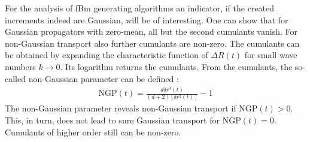 \documentclass[
  a4paper,BCOR10mm,oneside,
  headsepline,footsepline,%
  fleqn,openbib
]{scrbook}
\begin{document}

For the analysis of fBm generating algorithms an indicator, if the created increments indeed are Gaussian, will be of interesting. One can show that for Gaussian propagators with zero-mean, all but the second cumulants vanish. For non-Gaussian transport also further cumulants are non-zero. The cumulants can be obtained by expanding the characteristic function of $\Delta R(t)$ for small wave numbers $k \rightarrow 0$. Its logarithm returns the cumulants. From the cumulants, the so-called non-Gaussian parameter can be defined \cite{Hofling2013}:
\begin{align}
 \mathrm{NGP}(t)=\frac{d \delta r^{4}(t)}{(d+2) [\delta r^{2}(t)]}-1 \label{nongaussian2}
\end{align}
The non-Gaussian parameter reveals non-Gaussian transport if $\mathrm{NGP}(t)>0$. This, in turn, does not lead to sure Gaussian transport for $\mathrm{NGP}(t)=0$. Cumulants of higher order still can be non-zero. 
\end{document}
